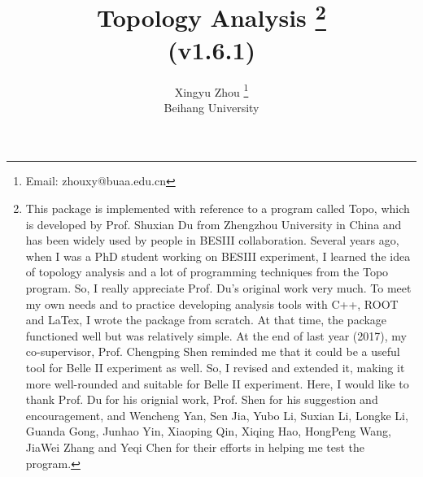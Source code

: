 \documentclass[landscape]{article}
\begin{document}
\title{Topology Analysis \footnote{\normalsize{This package is implemented with reference to a program called {\sc Topo}, which is developed by Prof. Shuxian Du from Zhengzhou University in China and has been widely used by people in BESIII collaboration. Several years ago, when I was a PhD student working on BESIII experiment, I learned the idea of topology analysis and a lot of programming techniques from the {\sc Topo} program. So, I really appreciate Prof. Du's original work very much. To meet my own needs and to practice developing analysis tools with C++, ROOT and LaTex, I wrote the package from scratch. At that time, the package functioned well but was relatively simple. At the end of last year (2017), my co-supervisor, Prof. Chengping Shen reminded me that it could be a useful tool for Belle II experiment as well. So, I revised and extended it, making it more well-rounded and suitable for Belle II experiment. Here, I would like to thank Prof. Du for his orignial work, Prof. Shen for his suggestion and encouragement, and Wencheng Yan, Sen Jia, Yubo Li, Suxian Li, Longke Li, Guanda Gong, Junhao Yin, Xiaoping Qin, Xiqing Hao, HongPeng Wang, JiaWei Zhang and Yeqi Chen for their efforts in helping me test the program.}} \\ \vspace{0.1cm} \Large{(v1.6.1)}}
\author{Xingyu Zhou \footnote{\normalsize{Email: zhouxy@buaa.edu.cn}} \\ \vspace{0.1cm} Beihang University}
\maketitle

\clearpage


\listoftables


\clearpage
\end{document}
